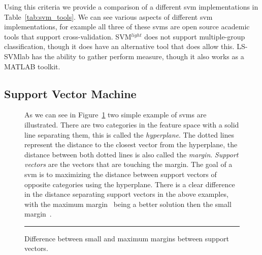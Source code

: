 Using this criteria we provide a comparison of a different \gls{svm} implementations in Table~\ref{tab:svm_tools}. We can see various aspects of different \gls{svm} implementations, for example all three of these \gls{svm}s are open source academic tools that support cross-validation. SVM$^{light}$ does not support multiple-group classification, though it does have an alternative tool that does allow this. LS-SVMlab has the ability to gather perform measure, though it also works as a MATLAB toolkit.


\subsection{Support Vector Machine}
\label{subsec:background_support_vector_machine}
\begin{figure}[ht]
  \centering
  \qquad
  \caption{Difference between small and maximum margins between support vectors.}
  \vspace{1mm}
  \footnotesize{As we can see in Figure~\ref{fig:SVM_margin} two simple example of \gls{svm}s are illustrated. There are two categories in the feature space with a solid line separating them, this is called the \emph{hyperplane}. The dotted lines represent the distance to the closest vector from the hyperplane, the distance between both dotted lines is also called the \emph{margin}. \emph{Support vectors} are the vectors that are touching the margin. The goal of a \gls{svm} is to maximizing the distance between support vectors of opposite categories using the hyperplane. There is a clear difference in the distance separating support vectors in the above examples, with the maximum margin~ being a better solution then the small margin~.}
  \vspace{2mm}
  \hrule
  \label{fig:SVM_margin}
\end{figure}

